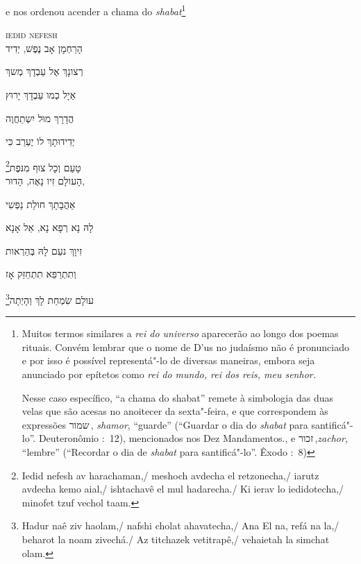 e nos ordenou acender a chama do \textit{shabat}\footnote{
Muitos termos similares a \textit{rei do universo} aparecerão ao
longo dos poemas rituais. Convém lembrar que o nome de D'us
no judaísmo não é pronunciado e por isso é possível representá"-lo de diversas
maneiras, embora seja anunciado por epítetos como \textit{rei do mundo, rei dos 
reis, meu senhor.}

Nesse caso específico, ``a chama do shabat'' remete à simbologia das duas 
velas que são acesas no anoitecer da sexta"-feira, e que correspondem
às expressões שמור\,, \emph{shamor}, ``guarde'' (``Guardar o dia do \emph{shabat} para
santificá"-lo''. Deuteronômio :~12), mencionados nos Dez
Mandamentos., 
e זכור\,,\emph{zachor}, 
``lembre'' (``Recordar o dia de
\emph{shabat} para santificá"-lo''. Êxodo :~8) 
}

\movetoevenpage
\raggedleft

\vspace*{1cm}

\textsc{iedid nefesh}\\[15pt]

הָרַחְמָן אָב נֶפֶשׁ, יְדִיד 

רְצונָךְ אֶל עַבְדָךְ מְשךְ 

אַיָל כְמו עַבְדָךְ יָרוּץ 

הֲדָרָךְ מוּל יִשְתַחֲוֶה 

יְדִידוּתָךְ לוֹ יֶעְרַב כִּי 

טָעַם וְכָל צוּף מִנּפֶת\footnote{Iedid nefesh av harachaman,/ meshoch avdecha el retzonecha,/ iarutz avdecha kemo aial,/ ishtachavê el mul hadarecha./ Ki ierav lo iedidotecha,/ minofet tzuf vechol taam.}\\[10pt]

הָעולָם זִיו נָאֶה, הָדוּר,

אַהֲבָתָךְ חולַת נַפְשִי 

לָהּ נָא רְפָא נָא, אֵל אָנָא 

זִיוָךְ נעַם לָהּ בְּהַרְאות

וְתִתְרַפֵּא תִתְחֵזֵּק אָז

עולָם שִׂמְחַת לָךְ וְהָיְתָה\footnote{Hadur naê ziv haolam,/ nafshi cholat ahavatecha,/ Ana El na, refá na la,/ beharot la noam zivechá./ Az titchazek vetitrapê,/ vehaietah la simchat olam.}\\[10pt]



